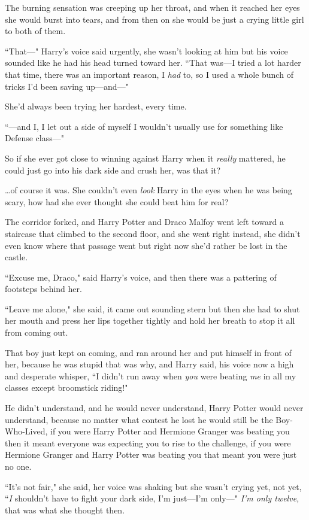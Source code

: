 The burning sensation was creeping up her throat, and when it reached her eyes she would burst into tears, and from then on she would be just a crying little girl to both of them.

``That—" Harry's voice said urgently, she wasn't looking at him but his voice sounded like he had his head turned toward her. ``That was—I tried a lot harder that time, there was an important reason, I \emph{had} to, so I used a whole bunch of tricks I'd been saving up—and—"

She'd always been trying her hardest, every time.

``—and I, I let out a side of myself I wouldn't usually use for something like Defense class—"

So if she ever got close to winning against Harry when it \emph{really} mattered, he could just go into his dark side and crush her, was that it?

{\ldots}of course it was. She couldn't even \emph{look} Harry in the eyes when he was being scary, how had she ever thought she could beat him for real?

The corridor forked, and Harry Potter and Draco Malfoy went left toward a staircase that climbed to the second floor, and she went right instead, she didn't even know where that passage went but right now she'd rather be lost in the castle.

``Excuse me, Draco," said Harry's voice, and then there was a pattering of footsteps behind her.

``Leave me alone," she said, it came out sounding stern but then she had to shut her mouth and press her lips together tightly and hold her breath to stop it all from coming out.

That boy just kept on coming, and ran around her and put himself in front of her, because he was stupid that was why, and Harry said, his voice now a high and desperate whisper, ``I didn't run away when \emph{you} were beating \emph{me} in all my classes except broomstick riding!"

He didn't understand, and he would never understand, Harry Potter would never understand, because no matter what contest he lost he would still be the Boy-Who-Lived, if you were Harry Potter and Hermione Granger was beating you then it meant everyone was expecting you to rise to the challenge, if you were Hermione Granger and Harry Potter was beating you that meant you were just no one.

``It's not fair," she said, her voice was shaking but she wasn't crying yet, not yet, ``\emph{I} shouldn't have to fight your dark side, I'm just—I'm only—" \emph{I'm only twelve,} that was what she thought then.

